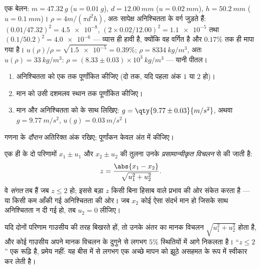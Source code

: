 \begin{example}[एक बेलन का घनत्व]\label{ex:b1:units-dimensions:density}
एक बेलन: $m = \qty{47.32}{g}$ ($u = \qty{0.01}{g}$),
$d = \qty{12.00}{mm}$ ($u = \qty{0.02}{mm}$), $h = \qty{50.2}{mm}$
($u = \qty{0.1}{mm}$)। $\rho = 4m/(\pi d^2 h)$, अतः सापेक्ष अनिश्चितता के वर्ग
जुड़ते हैं: $(0.01/47.32)^2 = \num{4.5e-8}$,
$(2 \times 0.02/12.00)^2 = \num{1.1e-5}$ तथा
$(0.1/50.2)^2 = \num{4.0e-6}$ --- व्यास ही हावी है, क्योंकि वह वर्गित है और
$0.17\%$ तक ही मापा गया है। $u(\rho)/\rho = \sqrt{\num{1.5e-5}}
= 0.39\%$; $\rho = \qty{8334}{kg/m^3}$, अतः $u(\rho) = \qty{33}{kg/m^3}$:
$\rho = (8.33 \pm 0.03)\times10^3\ \unit{kg/m^3}$ --- यानी पीतल।
\end{example}

\begin{method}[परिणाम लिखना]\label{met:b1:units-dimensions:writing}
\begin{enumerate}
  \item अनिश्चितता को एक  तक पूर्णांकित कीजिए (दो तक, यदि पहला अंक
        $1$ या $2$ हो)।
  \item मान को उसी दशमलव स्थान तक पूर्णांकित कीजिए।
  \item मान और अनिश्चितता को  के साथ लिखिए:
        $g = \qty{9.77\pm0.03}{m/s^2}$, अथवा $g = \qty{9.77}{m/s^2}$,
        $u(g) = \qty{0.03}{m/s^2}$।
\end{enumerate}
गणना के \emph{दौरान} अतिरिक्त अंक रखिए; पूर्णांकन केवल अंत में कीजिए।
\end{method}

\begin{definition}[प्रसामान्यीकृत विचलन]\label{def:b1:units-dimensions:zscore}
एक ही  के दो परिणामों $x_1 \pm u_1$ और $x_2 \pm u_2$ की तुलना उनके
\emph{प्रसामान्यीकृत विचलन} से की जाती है:
\[
z = \frac{\abs{x_1 - x_2}}{\sqrt{u_1^2 + u_2^2}} .
\]
वे \emph{संगत} तब हैं जब $z \leq 2$ हो; इससे बड़ा $z$ किसी बिना हिसाब वाले
प्रभाव की ओर संकेत करता है --- या किसी कम आँकी गई अनिश्चितता की ओर। जब $x_2$
कोई ऐसा संदर्भ मान हो जिसके साथ अनिश्चितता न दी गई हो, तब $u_2 = 0$ लीजिए।
\end{definition}

\begin{remark}[2 ही क्यों]\label{rem:b1:units-dimensions:why2}
यदि दोनों परिणाम गाउसीय की तरह बिखरते हों, तो उनके अंतर का मानक विचलन
$\sqrt{u_1^2 + u_2^2}$ होता है, और कोई गाउसीय अपने मानक विचलन के दुगुने से
लगभग $5\%$ स्थितियों में आगे निकलता है। ``$z \leq 2$'' एक रूढ़ि है, प्रमेय
नहीं: यह बीस में से लगभग एक अच्छे मापन को झूठे असहमत के रूप में स्वीकार कर
लेती है।
\end{remark}

